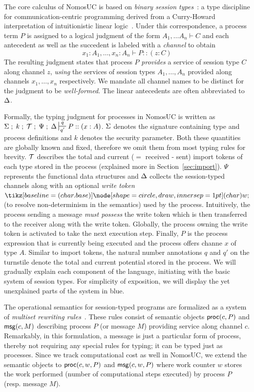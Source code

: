 
The core calculus of NomosUC is based on \emph{binary session types}~\cite{caires2010session}:
a type discipline for communication-centric programming derived from a Curry-Howard interpretation
of intuitionistic linear logic~\cite{girard1987linear}.
Under this correspondence, a process term $P$ is assigned to
a logical judgment of the form $A_1, \ldots A_n \vdash C$ and each antecedent as well as the succedent is
labeled with a \emph{channel} to obtain
\[
x_1 : A_1, \ldots, x_n : A_n \vdash P :: (z : C)
\]
The resulting judgment states that process $P$ \emph{provides} a service
of session type $C$ along channel $z$, \emph{using} the services of session
types $A_1, \ldots, A_n$ provided along channels $x_1, \ldots, x_n$ respectively.
We mandate all channel names to be distinct for the judgment
to be \emph{well-formed}.
The linear antecedents are often abbreviated to $\Delta$.

Formally, the typing judgment for processes in NomosUC is written as
$\Sg \semi k \semi \Tokens \semi \Psi \semi \D \entailpot{q}{q'} P :: (x : A)$.
$\Sigma$ denotes the signature containing type and process definitions and $k$
denotes the security parameter.
Both these quantities are globally known and fixed, therefore we omit them from
most typing rules for brevity.
$\mathcal{T}$ describes the total and current ($=$ received - sent) import tokens
of each type stored in the process (explained more in Section~\ref{sec:import}).
$\Psi$ represents the functional data structures and $\Delta$ collects the
session-typed channels along with an optional \emph{write token} $\wt$
(to resolve non-determinism in the semantics) used by the process.
Intuitively, the process sending a message \emph{must possess} the write
token which is then transferred to the receiver along with the write token.
Globally, the process owning the write token is activated to take the
next execution step.
Finally, $P$ is the process expression that is currently being executed and
the process offers channe $x$ of type $A$.
Similar to import tokens, the natural number annotations $q$ and $q'$ on the turnstile
denote the total and current potential stored in the process.
We will gradually explain each component of the language, initiating
with the basic system of session types.
For simplicity of exposition, we will display the yet unexplained
parts of the system in blue.

The operational semantics for session-typed programs are formalized as a
system of \emph{multiset rewriting rules}~\cite{cervesato2009relating}.
These rules consist of semantic objects $\mathsf{proc}(c, P)$ and $\mathsf{msg}(c, M)$ describing
process $P$ (or message $M$) providing service along channel $c$.
Remarkably, in this formulation, a message is just a particular form of process,
thereby not requiring any special rules for typing; it can be typed just as processes.
Since we track computational cost as well in NomosUC, we extend the semantic objects
to $\mathsf{proc}(c, w, P)$ and $\mathsf{msg}(c, w, P)$ where work counter $w$ stores the work performed
(number of computational steps executed) by process $P$ (resp. message $M$).


